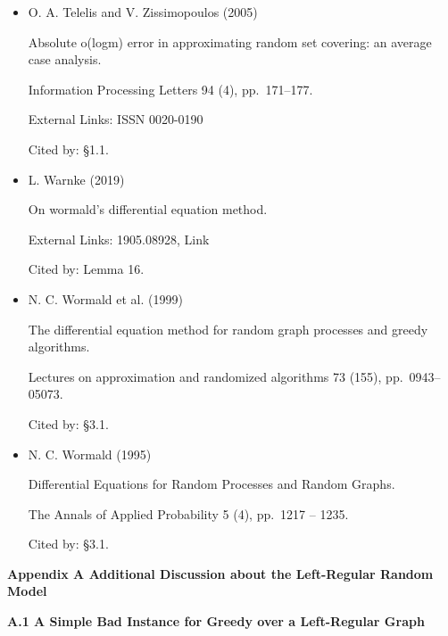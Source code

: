 \documentclass[10pt,a4paper]{article}
\begin{document}
\begin{itemize}
External Links: ISSN 2470-0053

Cited by: §1.1.



\item[] [29]
O. A. Telelis and V. Zissimopoulos (2005)

Absolute o(logm) error in approximating random set covering: an average case analysis.

Information Processing Letters 94 (4), pp. 171–177.

External Links: ISSN 0020-0190

Cited by: §1.1.



\item[] [30]
L. Warnke (2019)

On wormald’s differential equation method.

External Links: 1905.08928,
Link

Cited by: Lemma 16.



\item[] [31]
N. C. Wormald et al. (1999)

The differential equation method for random graph processes and greedy algorithms.

Lectures on approximation and randomized algorithms 73 (155), pp. 0943–05073.

Cited by: §3.1.



\item[] [32]
N. C. Wormald (1995)

Differential Equations for Random Processes and Random Graphs.

The Annals of Applied Probability 5 (4), pp. 1217 – 1235.

Cited by: §3.1.



\end{itemize}




\par\medskip\noindent\textbf{Appendix A Additional Discussion about the Left-Regular Random Model}\par




\par\medskip\noindent\textbf{A.1 A Simple Bad Instance for Greedy over a Left-Regular Graph}\par
\end{document}
